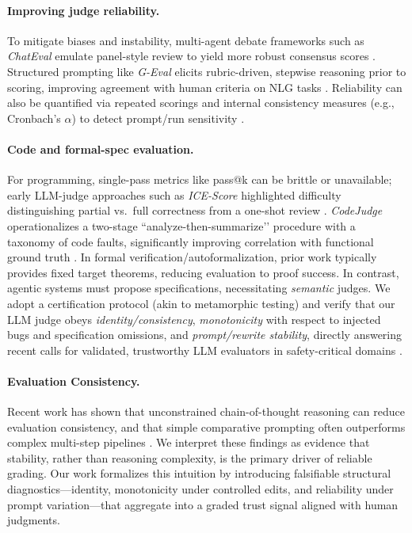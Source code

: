 \documentclass{article}
\begin{document}
\paragraph{Improving judge reliability.}
To mitigate biases and instability, multi-agent debate frameworks such as \emph{ChatEval} emulate panel-style review to yield more robust consensus scores \citep{Chan2024ChatEval}. Structured prompting like \emph{G-Eval} elicits rubric-driven, stepwise reasoning prior to scoring, improving agreement with human criteria on NLG tasks \citep{Liu2023GEval}. Reliability can also be quantified via repeated scorings and internal consistency measures (e.g., Cronbach’s $\alpha$) to detect prompt/run sensitivity \citep{Li2024TrustLLMJudgments}.

\paragraph{Code and formal-spec evaluation.}
For programming, single-pass metrics like pass@k can be brittle or unavailable; early LLM-judge approaches such as \emph{ICE-Score} highlighted difficulty distinguishing partial vs.\ full correctness from a one-shot review \citep{Zhuo2024ICEScore}. \emph{CodeJudge} operationalizes a two-stage “analyze-then-summarize’’ procedure with a taxonomy of code faults, significantly improving correlation with functional ground truth \citep{TongZhang2024CodeJudge}. In formal verification/autoformalization, prior work typically provides fixed target theorems, reducing evaluation to proof success. In contrast, agentic systems must propose specifications, necessitating \emph{semantic} judges. We adopt a certification protocol (akin to metamorphic testing) and verify that our LLM judge obeys \emph{identity/consistency}, \emph{monotonicity} with respect to injected bugs and specification omissions, and \emph{prompt/rewrite stability}, directly answering recent calls for validated, trustworthy LLM evaluators in safety-critical domains \citep{Kocmi2024HumanVsLLM,Li2024TrustLLMJudgments}.

\paragraph{Evaluation Consistency.}
Recent work has shown that unconstrained chain-of-thought reasoning can reduce evaluation consistency, and that simple comparative prompting often outperforms complex multi-step pipelines \citep{chen2026rethinking}. We interpret these findings as evidence that stability, rather than reasoning complexity, is the primary driver of reliable grading. Our work formalizes this intuition by introducing falsifiable structural diagnostics---identity, monotonicity under controlled edits, and reliability under prompt variation---that aggregate into a graded trust signal aligned with human judgments.
\end{document}

